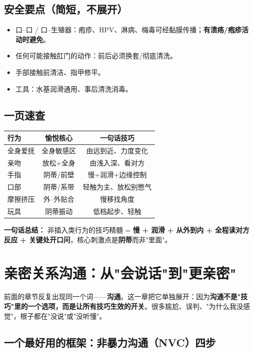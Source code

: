 \documentclass[12pt,UTF8,openany]{ctexbook}
\begin{document}
\section{安全要点（简短，不展开）}

\begin{itemize}[leftmargin=2em,itemsep=0.3em]
  \item 口--口 / 口--生殖器：疱疹、HPV、淋病、梅毒可经黏膜传播；\textbf{有溃疡/疱疹活动时避免}。
  \item 任何可能接触肛门的动作：前后必须换套/彻底清洗。
  \item 手部接触前清洁、指甲修平。
  \item 工具：水基润滑通用、事后清洗消毒。
\end{itemize}

\section{一页速查}

\begin{tabularx}{\textwidth}{lCC}
\toprule
行为 & 愉悦核心 & 一句话技巧 \\
\midrule
全身爱抚 & 全身敏感区 & 由远到近、力度变化 \\
亲吻 & 放松+全身 & 由浅入深、看对方 \\
手指 & 阴蒂/前壁 & 慢+润滑+边缘控制 \\
口部 & 阴蒂/系带 & 轻触为主、放松别憋气 \\
摩擦挤压 & 外--外贴合 & 慢移找角度 \\
玩具 & 阴蒂振动 & 低档起步、轻触 \\
\bottomrule
\end{tabularx}

\vspace{1em}
\noindent\textbf{一句话总结：} 非插入类行为的技巧精髓 = \textbf{慢 + 润滑 + 从外到内 + 全程读对方反应 + 关键处开口问}，核心刺激点是\textbf{阴蒂}而非"里面"。

\chapter{亲密关系沟通：从"会说话"到"更亲密"}
\label{chap:communication}

前面的章节反复出现同一个词——\textbf{沟通}。这一章把它单独展开：因为\textbf{沟通不是"技巧"里的一个选项，而是让所有技巧生效的开关}。很多尴尬、误判、"为什么我没感觉"，根子都在"没说"或"没听懂"。

\section{一个最好用的框架：非暴力沟通（NVC）四步}
\end{document}
